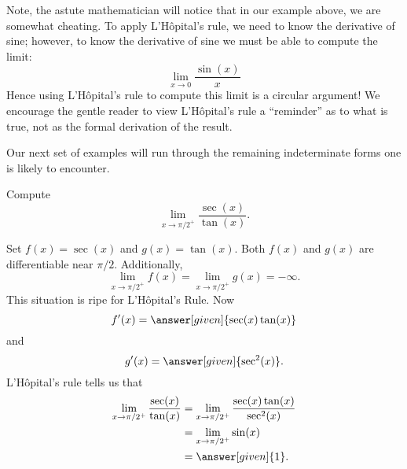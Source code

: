 \documentclass{ximera}
\begin{document}
\begin{remark}
  Note, the astute mathematician will notice that in our example
  above, we are somewhat cheating. To apply L'H\^ opital's rule, we
  need to know the derivative of sine; however, to know the derivative
  of sine we must be able to compute the limit:
  \[
  \lim_{x\to 0}\frac{\sin(x)}{x}
  \]
  Hence using L'H\^{o}pital's rule to compute this limit is a circular
  argument! We encourage the gentle reader to view L'H\^{o}pital's rule
  a ``reminder'' as to what is true, not as the formal derivation of
  the result.
\end{remark}


Our next set of examples will run through the remaining indeterminate
forms one is likely to encounter.

\begin{example}
  Compute 
\[
\lim_{x\to \pi/2^+} \frac{\sec(x)}{\tan(x)}.
\]
\begin{explanation}
Set $f(x) = \sec(x)$ and $g(x) = \tan(x)$. Both $f(x)$ and $g(x)$
are differentiable near $\pi/2$. Additionally,
\[
\lim_{x \to \pi/2^+} f(x) = \lim_{x \to \pi/2^+}g(x) = -\infty.
\]
This situation is ripe for L'H\^opital's Rule. Now 
\[
f'(x) = \answer[given]{\sec(x)\tan(x)}
\]
and
\[
g'(x) = \answer[given]{\sec^2(x)}.
\]
L'H\^{o}pital's rule tells us that 
\begin{align*}
\lim_{x\to \pi/2^+} \frac{\sec(x)}{\tan(x)} &= \lim_{x\to \pi/2^+}
\frac{\sec(x)\tan(x)}{\sec^2(x)} \\
&= \lim_{x\to \pi/2^+} \sin(x)\\
&=\answer[given]{1}.
\end{align*}
\end{explanation}
\end{example}
\end{document}
